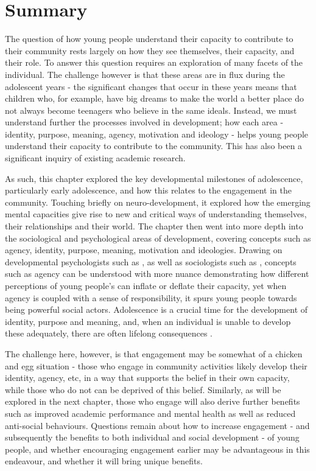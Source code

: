 \section{Summary} 

The question of how young people understand their capacity to contribute to their community rests largely on how they see themselves, their capacity, and their role. To answer this question requires an exploration of many facets of the individual. The challenge however is that these areas are in flux during the adolescent years - the significant changes that occur in these years means that children who, for example, have big dreams to make the world a better place do not always become teenagers who believe in the same ideals. Instead, we must understand further the processes involved in development; how each area - identity, purpose, meaning, agency, motivation and ideology - helps young people understand their capacity to contribute to the community. This has also been a significant inquiry of existing academic research. 

As such, this chapter explored the key developmental milestones of adolescence, particularly early adolescence, and how this relates to the engagement in the community. Touching briefly on neuro-development, it explored how the emerging mental capacities give rise to new and critical ways of understanding themselves, their relationships and their world. The chapter then went into more depth into the sociological and psychological areas of development, covering concepts such as agency, identity, purpose, meaning, motivation and ideologies. Drawing on developmental psychologists such as \citet{Youniss1997b,Yates1998}, as well as sociologists such as \citet{Harris2010, White2008}, concepts such as agency can be understood with more nuance demonstrating how different perceptions of young people's can inflate or deflate their capacity, yet when agency is coupled with a sense of responsibility, it spurs young people towards being powerful social actors. Adolescence is a crucial time for the development of identity, purpose and meaning, and, when an individual is unable to develop these adequately, there are often lifelong consequences \citep{Flanagan2008}. 

The challenge here, however, is that engagement may be somewhat of a chicken and egg situation - those who engage in community activities likely develop their identity, agency, etc, in a way that supports the belief in their own capacity, while those who do not can be deprived of this belief. Similarly, as will be explored in the next chapter, those who engage will also derive further benefits such as improved academic performance and mental health as well as reduced anti-social behaviours. Questions remain about how to increase engagement - and subsequently the benefits to both individual and social development - of young people, and whether encouraging engagement earlier may be advantageous in this endeavour, and whether it will bring unique benefits. 


